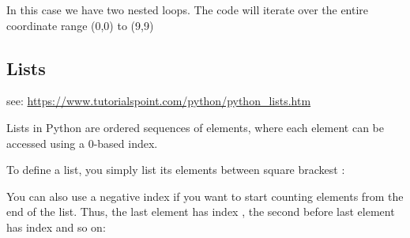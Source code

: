 In this case we have two nested loops. The code will iterate over
the entire coordinate range (0,0) to (9,9)


\subsection{Lists}
\label{\detokenize{lesson/prg/python_intro:lists}}
see: \url{https://www.tutorialspoint.com/python/python\_lists.htm}

Lists in Python are ordered sequences of elements, where each element
can be accessed using a 0-based index.

To define a list, you simply list its elements between square brackest
\sphinxcode{{[}{]}}:

\begin{sphinxVerbatim}[commandchars=\\\{\}]
   \PYG{p}{[}    \PYG{p}{]}
\PYG{p}{[}\PYG{p}{]} 
\PYG{p}{[}\PYG{p}{]} 
\end{sphinxVerbatim}

You can also use a negative index if you want to start counting
elements from the end of the list. Thus, the last element has index
, the second before last element has index  and so on:

\begin{sphinxVerbatim}[commandchars=\\\{\}]
\PYG{p}{[}\PYG{p}{]} 
\PYG{p}{[}\PYG{p}{]} 
\end{sphinxVerbatim}

